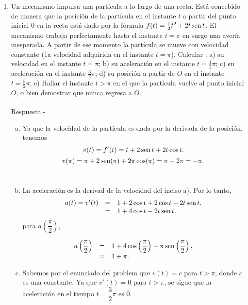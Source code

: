 \begin{enumerate}[\bfseries 1.]
    \item Un mecanismo impulsa una partícula a lo largo de una recta. Está concebido de manera que la posición de la partícula en el instante $t$ a partir del punto inicial $0$ en la recta está dado por la fórmula $f(t) = \frac{1}{2}t^2 + 2t \mathop{\mbox{\normalfont sen}}\nolimits t$. El mecanismo trabaja perfectamente hasta el instante $t = \pi$ en surge una avería inesperada. A partir de ese momento la partícula se mueve con velocidad constante (1a velocidad adquirida en el instante $t=\pi$). Calcular : a) su velocidad en el instante $t=\pi$; b) su aceleración en el instante $t=\frac{1}{2}\pi$; c) su aceleración en el instante $\frac{3}{2}\pi$; d) su posición a partir de $O$ en el instante $t=\frac{5}{2}\pi$; e) Hallar el instante $t>\pi$ en el que la partícula vuelve al punto inicial $O$, o bien demostrar que nunca regresa a $O$.\\\\
	Respuesta.-\; 
	\begin{enumerate}[a)]
	    \item Ya que la velocidad de la partícula es dada por la derivada de la posición, tenemos
	$$v(t)=f'(t)=t+2\mathop{\mbox{\normalfont sen}}\nolimits t + 2t\cos t.$$
	$$v(\pi) = \pi + 2\mathop{\mbox{\normalfont sen}}\nolimits(\pi)+2\pi\cos(\pi)=\pi -2\pi = -\pi.$$\\
	    \item La aceleración es la derivad de la velocidad del inciso a). Por lo tanto,
		$$\begin{array}{rcl}
		    a(t) = v'(t) &=& 1+2\cos t + 2\cos t -2t\mathop{\mbox{\normalfont sen}}\nolimits t.\\
			 &=& 1+4\cos t -2t\mathop{\mbox{\normalfont sen}}\nolimits t.
		\end{array}$$
		para $a\left(\dfrac{\pi}{2}\right)$,	

		$$\begin{array}{rcl}
		    a\left(\dfrac{\pi}{2}\right) &=& 1+4\cos\left(\dfrac{\pi}{2}\right) -\pi\mathop{\mbox{\normalfont sen}}\nolimits\left(\dfrac{\pi}{2}\right).\\
						 &=&1+\pi.
		\end{array}$$
		\vspace{.5cm}

	    \item Sabemos por el enunciado del problem que  $v(t)=c$ para $t>\pi$, donde $c$ es una constante. Ya que $v'(t)=0$ para $t>\pi$, se sigue que la aceleración en el tiempo $t=\dfrac{3}{2}\pi$ es $0$.\\\\


\end{enumerate}
\end{enumerate}
